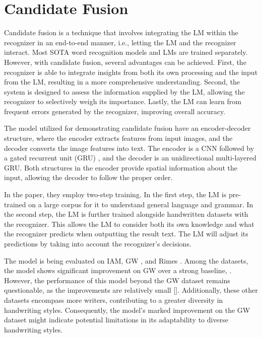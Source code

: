\section{Candidate Fusion}
\label{sec:2_candidate_fusion}
Candidate fusion \citep{kang2021candidate} is a technique that involves integrating the LM within the recognizer in an end-to-end manner, i.e., letting the LM and the recognizer interact. Most SOTA word recognition models and LMs are trained separately. However, with candidate fusion, several advantages can be achieved. First, the recognizer is able to integrate insights from both its own processing and the input from the LM, resulting in a more comprehensive understanding. Second, the system is designed to assess the information supplied by the LM, allowing the recognizer to selectively weigh its importance. Lastly, the LM can learn from frequent errors generated by the recognizer, improving overall accuracy.

The model utilized for demonstrating candidate fusion have an encoder-decoder structure, where the encoder extracts features from input images, and the decoder converts the image features into text. The encoder is a CNN followed by a gated recurrent unit (GRU) \citep{dey2017gate}, and the decoder is an unidirectional multi-layered GRU. Both structures in the encoder provide spatial information about the input, allowing the decoder to follow the proper order.

In the paper, they employ \hypertarget{2_two_step}{two-step training}. In the first step, the LM is pre-trained on a large corpus for it to understand general language and grammar. In the second step, the LM is further trained alongside handwritten datasets with the recognizer. This allows the LM to consider both its own knowledge and what the recognizer predicts when outputting the result text. The LM will adjust its predictions by taking into account the recognizer's decisions.

The model is being evaluated on IAM, GW \citep{fischer2012lexicon}, and Rimes \citep{grosicki2011icdar}. Among the datasets, the model shows significant improvement on GW over a strong baseline, \cite{dutta2018improving}. However, the performance of this model beyond the GW dataset remains questionable, as the improvements are relatively small []. Additionally, these other datasets encompass more writers, contributing to a greater diversity in handwriting styles. Consequently, the model's marked improvement on the GW dataset might indicate potential limitations in its adaptability to diverse handwriting styles.

